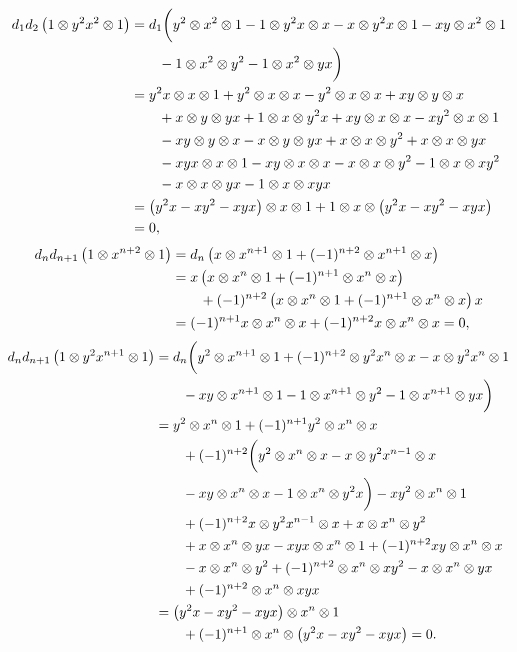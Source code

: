 \documentclass[fleqn,../tesis.tex]{subfiles}
\begin{document}
\begin{align*}
	d_1 d_2\left(1 \otimes y^2x^2 \otimes 1\right) &= d_1\bigg(y^2 \otimes x^2 \otimes 1 - 1 \otimes y^2x \otimes x - x \otimes y^2x \otimes 1 - xy\otimes x^2 \otimes 1 \\
	&\qquad - 1 \otimes x^2\otimes y^2 - 1 \otimes x^2 \otimes yx\bigg)\\
	&= y^2x \otimes  x \otimes 1  + y^2 \otimes x \otimes x - y^2 \otimes x \otimes x + xy \otimes y \otimes x \\
	&\qquad+ x \otimes y \otimes yx + 1 \otimes x \otimes y^2x + xy \otimes x \otimes x - xy^2 \otimes x \otimes 1\\
	&\qquad -xy \otimes y\otimes x - x \otimes y \otimes yx + x \otimes x \otimes y^2 + x \otimes x \otimes yx \\
	&\qquad - xyx \otimes x \otimes 1 - xy \otimes x \otimes x - x \otimes x \otimes y^2 - 1 \otimes x \otimes xy^2\\
	&\qquad - x \otimes x \otimes yx - 1 \otimes x \otimes xyx\\
	&= \left(y^2x - xy^2 - xyx\right) \otimes x \otimes 1 + 1 \otimes x \otimes \left(y^2x -xy^2 - xyx\right)\\
	&= 0,
\end{align*}
\begin{align*}
	d_n d_{n + 1}\left(1\otimes x^{n + 2}\otimes 1\right) &=
		d_n\left(x\otimes x^{n + 1}\otimes 1 + (-1)^{n + 2}\otimes x^{n + 1}\otimes x\right)\\
	&= x\left(x \otimes x^{n}\otimes 1 + (-1)^{n + 1}\otimes x^{n}\otimes x\right)\\
	&\qquad + (-1)^{n + 2}\left(x \otimes x^{n}\otimes 1 + (-1)^{n + 1}\otimes x^{n}\otimes x\right)x\\
	&= (-1)^{n + 1}x\otimes x^{n}\otimes x + (-1)^{n + 2}x\otimes x^{n}\otimes x = 0,
\end{align*}
\begin{align*}
	d_n d_{n + 1}\left(1\otimes y^{2}x^{n + 1} \otimes 1\right) &=
		d_n\bigg(y^2 \otimes x^{n + 1} \otimes 1 +  (-1)^{n + 2} \otimes y^2x^{n} \otimes x - x\otimes y^{2}x^{n} \otimes 1 \\
	&\qquad - xy \otimes x^{n + 1} \otimes 1 - 1 \otimes x^{n + 1} \otimes y^2 - 1 \otimes x^{n + 1}\otimes yx\bigg)\\
	&= y^2\otimes x^{n} \otimes 1 + (-1)^{n + 1}y^{2}\otimes x^{n}\otimes x\\
	&\qquad + (-1)^{n + 2}\bigg(y^2 \otimes x^{n} \otimes x -x \otimes y^{2}x^{n - 1}\otimes x\\
	&\qquad - xy \otimes x^{n} \otimes x - 1 \otimes x^n \otimes y^2x\bigg) -xy^{2}\otimes x^{n} \otimes 1\\
	&\qquad + (-1)^{n + 2}x \otimes y^2x^{n - 1}\otimes x + x \otimes x^{n}\otimes y^2\\
	&\qquad + x\otimes x^{n}\otimes yx - xyx \otimes x^{n} \otimes 1 + (-1)^{n + 2}xy \otimes x^{n} \otimes x\\
	&\qquad - x \otimes x^{n}\otimes y^2 + (-1)^{n + 2}\otimes x^{n} \otimes xy^{2} - x \otimes x^{n} \otimes yx\\
	&\qquad + (-1)^{n+ 2} \otimes x^{n} \otimes xyx\\
	&= \left(y^2x - xy^2 - xyx\right)\otimes x^{n} \otimes 1\\
	&\qquad + (-1)^{n + 1} \otimes x^{n} \otimes\left(y^2x - xy^2 - xyx\right) = 0.
\end{align*}
\end{document}

